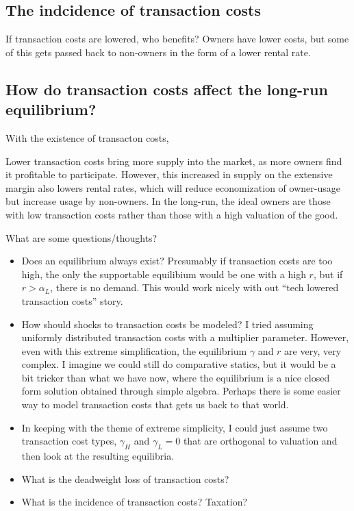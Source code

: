 \subsection{The indcidence of transaction costs} 
If transaction costs are lowered, who benefits?
Owners have lower costs, but some of this gets passed back to non-owners in the form of a lower rental rate. 

\subsection{How do transaction costs affect the long-run equilibrium?} 
With the existence of transacton costs,

Lower transaction costs bring more supply into the market, as more owners find it profitable to participate.
However, this increased in supply on the extensive margin also lowers rental rates, which will reduce economization of owner-usage but increase usage by non-owners.
In the long-run, the ideal owners are those with low transaction costs rather than those with a high valuation of the good.

What are some questions/thoughts?
\begin{itemize}
\item Does an equilibrium always exist? Presumably if transaction costs are too high, the only the supportable equilibium would be one with a high $r$, but if $r > \alpha_L$, there is no demand. This would work nicely with out ``tech lowered transaction costs'' story. 
\item How should shocks to transaction costs be modeled? I tried assuming uniformly distributed transaction costs with a multiplier parameter. However, even with this extreme simplification, the equilibrium $\gamma$ and $r$ are very, very complex. I imagine we could still do comparative statics, but it would be a bit tricker than what we have now, where the equilibrium is a nice closed form solution obtained through simple algebra. Perhaps there is some easier way to model transaction costs that gets us back to that world. 
\item In keeping with the theme of extreme simplicity, I could just assume two transaction cost types, $\gamma_H$ and $\gamma_L = 0$ that are orthogonal to valuation and then look at the resulting equilibria.
\item What is the deadweight loss of transaction costs?
  \item What is the incidence of transaction costs? Taxation? 
\end{itemize} 

